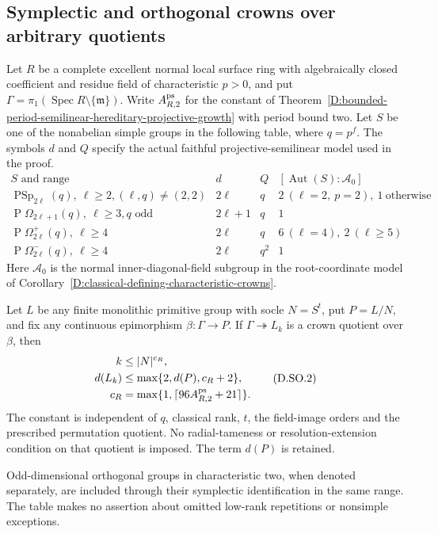 \subsection{Symplectic and orthogonal crowns over arbitrary quotients}

\begin{corollary}
\label{D:arbitrary-quotient-symplectic-orthogonal-crowns}
Let $R$ be a complete excellent normal local surface ring
with algebraically closed coefficient and residue field
of characteristic $p>0$, and put
$\Gamma=\pi_1(\operatorname{Spec}R\setminus\{\mathfrak m\})$.
Write $A^{\rm ps}_{R,2}$ for the constant of
Theorem~\ref{D:bounded-period-semilinear-hereditary-projective-growth}
with period bound two. Let $S$ be one of the nonabelian
simple groups in the following table, where $q=p^f$.
The symbols $d$ and $Q$ specify the actual faithful
projective-semilinear model used in the proof.
\[
\begin{array}{c|c|c|c}
 S\text{ and range}&d&Q&[\operatorname{Aut}(S):\mathcal A_0]\\ \hline
 \operatorname{PSp}_{2\ell}(q),\ \ell\ge2,
       (\ell,q)\ne(2,2)
       &2\ell&q&2\ (\ell=2,\ p=2),\ 1\ \text{otherwise}\\
 \operatorname{P}\Omega_{2\ell+1}(q),\ \ell\ge3,
       q\text{ odd}
       &2\ell+1&q&1\\
 \operatorname{P}\Omega^+_{2\ell}(q),\ \ell\ge4
       &2\ell&q&6\ (\ell=4),\ 2\ (\ell\ge5)\\
 \operatorname{P}\Omega^-_{2\ell}(q),\ \ell\ge4
       &2\ell&q^2&1
\end{array}                                                    \tag{D.SO.1}
\]
Here $\mathcal A_0$ is the normal inner-diagonal-field
subgroup in the root-coordinate model of
Corollary~\ref{D:classical-defining-characteristic-crowns}.

Let $L$ be any finite monolithic primitive group with
socle $N=S^t$, put $P=L/N$, and fix any continuous
epimorphism $\beta:\Gamma\to P$.
If $\Gamma\twoheadrightarrow L_k$ is a crown quotient
over $\beta$, then
\[
 \begin{aligned}
 k&\le |N|^{c_R},\\
 d(L_k)&\le\max\{2,d(P),c_R+2\},\\
 c_R&=\max\{1,\lceil96A^{\rm ps}_{R,2}+21\rceil\}.
 \end{aligned}                                                \tag{D.SO.2}
\]
The constant is independent of $q$, classical rank,
$t$, the field-image orders and the prescribed
permutation quotient. No radial-tameness or
resolution-extension condition on that quotient
is imposed. The term $d(P)$ is retained.

Odd-dimensional orthogonal groups in characteristic
two, when denoted separately, are included through
their symplectic identification in the same range.
The table makes no assertion about omitted low-rank
repetitions or nonsimple exceptions.
\end{corollary}

